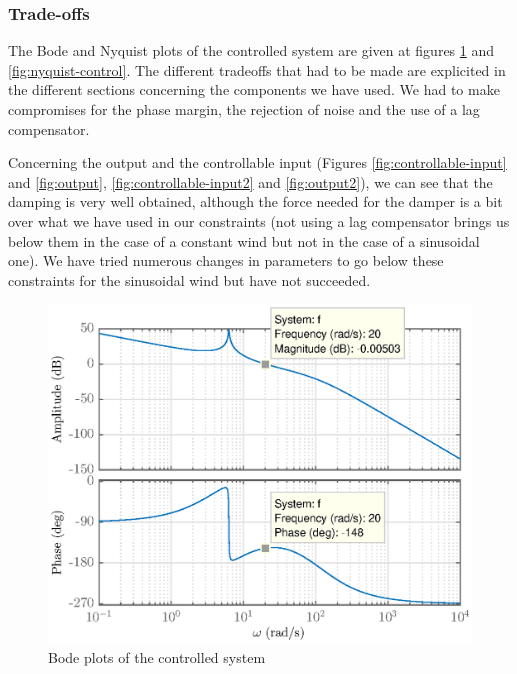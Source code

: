 \subsubsection{Trade-offs}
The Bode and Nyquist plots of the controlled system are given at figures \ref{fig:bode-control} and \ref{fig:nyquist-control}. The different tradeoffs that had to be made are explicited in the different sections concerning the components we have used. We had to make compromises for the phase margin, the rejection of noise and the use of a lag compensator.\par
Concerning the output and the controllable input (Figures \ref{fig:controllable-input} and \ref{fig:output}, \ref{fig:controllable-input2} and \ref{fig:output2}), we can see that the damping is very well obtained, although the force needed for the damper is a bit over what we have used in our constraints (not using a lag compensator brings us below them in the case of a constant wind but not in the case of a sinusoidal one). We have tried numerous changes in parameters to go below these constraints for the sinusoidal wind but have not succeeded.
\begin{figure}[H]
    \centering
    \includegraphics[scale = 0.8]{resources/eps/4-Val/L.eps}
    \caption{Bode plots of the controlled system}
    \label{fig:bode-control}
\end{figure}
